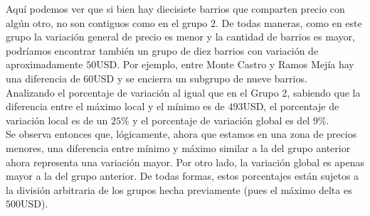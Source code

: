 \documentclass[a4paper, 10pt]{article}
\newcommand\tab[1][0.5cm]{\hspace*{#1}}
\begin{document}
				  	\tab Aquí podemos ver que si bien hay diecisiete barrios que comparten precio con algún otro, no son contiguos
				  	como en el grupo 2. De todas maneras, como en este grupo la variación general de precio es menor y la cantidad
				  	de barrios es mayor, podríamos encontrar también un grupo de diez barrios con variación de aproximadamente
				  	$50$USD. Por ejemplo, entre Monte Castro y Ramos Mejía hay una diferencia de $60$USD y se encierra un subgrupo
				  	de nueve barrios. \\
				  	\tab Analizando el porcentaje de variación al igual que en el Grupo 2, sabiendo que la diferencia entre el
				  	máximo local y el mínimo es de $493$USD, el porcentaje de variación local es de un $25\%$ y el porcentaje
				  	de variación global es del $9\%$. \\
				  	\tab Se observa entonces que, lógicamente, ahora que estamos en una zona de precios menores, una diferencia
				  	entre mínimo y máximo similar a la del grupo anterior ahora representa una variación mayor. Por otro lado,
				  	la variación global es apenas mayor a la del grupo anterior. De todas formas, estos porcentajes están sujetos
				  	a la división arbitraria de los grupos hecha previamente (pues el máximo delta es $500$USD).
\end{document}
